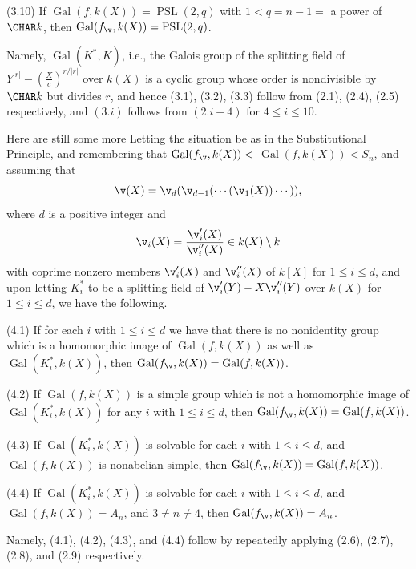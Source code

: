 {\rm(3.10)} If 
$\operatorname{Gal}(f,k(X))=\operatorname{PSL}(2,q)$ with 
$1<q=n-1=$ a power of
$\CHAR k$, then $\operatorname{Gal}(f_{\v},k(X))=%
\operatorname{PSL}(2,q)$.
\endproclaim

Namely, 
$\operatorname{Gal}(K^*,K)$, i.e., the Galois group of the 
splitting field of 
$Y^{|r|}-\left(\frac{X}{c}\right)^{r/|r|}$ over $k(X)$ is 
a cyclic group whose order is nondivisible by $\CHAR k$ 
but divides $r$,
and hence (3.1), (3.2), (3.3) follow from (2.1), (2.4), 
(2.5) respectively,
and $(3.i)$ follows from $(2.i+4)$ for $4\le i\le 10$.

Here are still some more
Letting the situation be as in the Substitutional 
Principle, and remembering
that $\operatorname{Gal}(f_{\v},k(X))<$ 
$\operatorname{Gal}(f,k(X))<S_n$, 
and assuming that 
$$\v(X)=\v_d(\v_{d-1}(\dotsb(\v_1(X))\dotsb)),$$ 
where $d$
is a positive integer and 
$$\v_i(X)=\frac{\v'_i(X)}{\v''_i(X)}\in k(X)\setminus k$$ 
with coprime 
nonzero members $\v'_i(X)$ and $\v''_i(X)$ of $k[X]$ for 
$1\le i\le d$, and 
upon letting $K^*_i$ to be a splitting field of
$\v'_i(Y)-X\v''_i(Y)$ over $k(X)$ for $1\le i\le d$, we 
have the following. 

{\rm(4.1)} If for each $i$ with $1\le i\le d$ we have that 
there is no nonidentity 
group which is a homomorphic image of 
$\operatorname{Gal}(f,k(X))$ as well as  
$\operatorname{Gal}(K^*_i,k(X))$, then $%
\operatorname{Gal}(f_{\v},k(X))=%
\operatorname{Gal}(f,k(X))$.

{\rm(4.2)} If $\operatorname{Gal}(f,k(X))$ is a simple 
group which is not a homomorphic 
image of %
$\operatorname{Gal}(K^*_i,k(X))$ for any $i$ with $1\le 
i\le d$, 
then $\operatorname{Gal}(f_{\v},k(X))=%
\operatorname{Gal}(f,k(X))$.

{\rm(4.3)} If $\operatorname{Gal}(K^*_i,k(X))$ is solvable 
for each $i$ with 
$1\le i\le d$, and$\operatorname{Gal}(f,k(X))$ is 
nonabelian simple,
then $\operatorname{Gal}(f_{\v},k(X))=%
\operatorname{Gal}(f,k(X))$.

{\rm(4.4)} If $\operatorname{Gal}(K^*_i,k(X))$ is solvable 
for each $i$ with 
$1\le i\le d$, and$\operatorname{Gal}(f,k(X))=A_n$, and 
$3\ne n\ne 4$, then 
$\operatorname{Gal}(f_{\v},k(X))=A_n$.
\endproclaim

Namely, (4.1), (4.2), (4.3), and (4.4) follow by 
repeatedly applying
(2.6), (2.7), (2.8), and (2.9) respectively.

